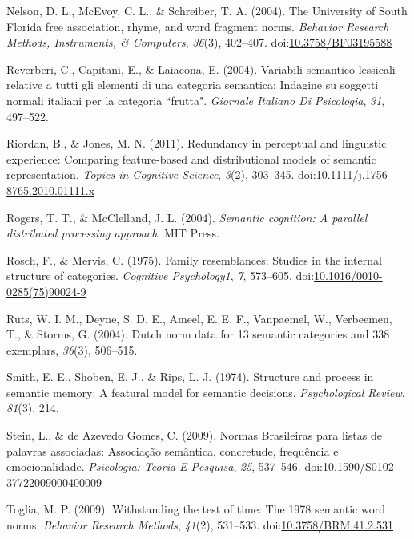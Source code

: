 \documentclass[english,man]{apa6}
\theoremstyle{definition}
\theoremstyle{definition}
\theoremstyle{definition}
\theoremstyle{remark}
\begin{document}
\hypertarget{ref-Nelson2004}{}
Nelson, D. L., McEvoy, C. L., \& Schreiber, T. A. (2004). The University
of South Florida free association, rhyme, and word fragment norms.
\emph{Behavior Research Methods, Instruments, \& Computers},
\emph{36}(3), 402--407.
doi:\href{https://doi.org/10.3758/BF03195588}{10.3758/BF03195588}

\hypertarget{ref-Reverberi2004}{}
Reverberi, C., Capitani, E., \& Laiacona, E. (2004). Variabili semantico
lessicali relative a tutti gli elementi di una categoria semantica:
Indagine su soggetti normali italiani per la categoria ``frutta".
\emph{Giornale Italiano Di Psicologia}, \emph{31}, 497--522.

\hypertarget{ref-Riordan2011}{}
Riordan, B., \& Jones, M. N. (2011). Redundancy in perceptual and
linguistic experience: Comparing feature-based and distributional models
of semantic representation. \emph{Topics in Cognitive Science},
\emph{3}(2), 303--345.
doi:\href{https://doi.org/10.1111/j.1756-8765.2010.01111.x}{10.1111/j.1756-8765.2010.01111.x}

\hypertarget{ref-Rogers2004}{}
Rogers, T. T., \& McClelland, J. L. (2004). \emph{Semantic cognition: A
parallel distributed processing approach}. MIT Press.

\hypertarget{ref-Rosch1975}{}
Rosch, F., \& Mervis, C. (1975). Family resemblances: Studies in the
internal structure of categories. \emph{Cognitive Psychology1},
\emph{7}, 573--605.
doi:\href{https://doi.org/10.1016/0010-0285(75)90024-9}{10.1016/0010-0285(75)90024-9}

\hypertarget{ref-Ruts2004}{}
Ruts, W. I. M., Deyne, S. D. E., Ameel, E. E. F., Vanpaemel, W.,
Verbeemen, T., \& Storms, G. (2004). Dutch norm data for 13 semantic
categories and 338 exemplars, \emph{36}(3), 506--515.

\hypertarget{ref-Smith1974}{}
Smith, E. E., Shoben, E. J., \& Rips, L. J. (1974). Structure and
process in semantic memory: A featural model for semantic decisions.
\emph{Psychological Review}, \emph{81}(3), 214.

\hypertarget{ref-Stein2009}{}
Stein, L., \& de Azevedo Gomes, C. (2009). Normas Brasileiras para
listas de palavras associadas: Associação semântica, concretude,
frequência e emocionalidade. \emph{Psicologia: Teoria E Pesquisa},
\emph{25}, 537--546.
doi:\href{https://doi.org/10.1590/S0102-37722009000400009}{10.1590/S0102-37722009000400009}

\hypertarget{ref-Toglia2009}{}
Toglia, M. P. (2009). Withstanding the test of time: The 1978 semantic
word norms. \emph{Behavior Research Methods}, \emph{41}(2), 531--533.
doi:\href{https://doi.org/10.3758/BRM.41.2.531}{10.3758/BRM.41.2.531}
\end{document}
